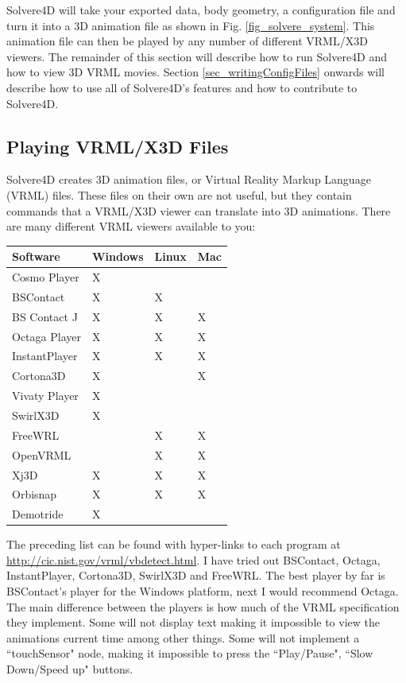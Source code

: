\documentclass[singlecolumn,12pt]{article}
\begin{document}
Solvere4D will take your exported data, body geometry, a
configuration file and turn it into a 3D animation file as shown in
Fig. \ref{fig_solvere_system}. This animation file can then be
played by any number of different VRML/X3D viewers. The remainder of
this section will describe how to run Solvere4D and how to view 3D
VRML movies. Section \ref{sec_writingConfigFiles} onwards will
describe how to use all of Solvere4D's features and how to
contribute to Solvere4D.

\subsection{Playing VRML/X3D Files}

Solvere4D creates 3D animation files, or Virtual Reality Markup
Language (VRML) files. These files on their own are not useful, but
they contain commands that a VRML/X3D viewer can translate into 3D
animations. There are many different VRML viewers available to you:

\vspace{1cm}
\begin{tabular}{l | l | l | l}
Software & Windows & Linux & Mac \\
\hline Cosmo Player & X & & \\
BSContact & X & X & \\
BS Contact J & X & X & X \\
Octaga Player & X & X & X \\
InstantPlayer & X & X & X \\
Cortona3D & X & & X \\
Vivaty Player & X & & \\
SwirlX3D & X & & \\
FreeWRL & & X & X \\
OpenVRML & & X & X \\
Xj3D & X & X & X  \\
Orbisnap & X & X & X \\
Demotride & X & & \\
\end{tabular}
\vspace{1cm}

The preceding list can be found with hyper-links to each program at
\url{http://cic.nist.gov/vrml/vbdetect.html}. I have tried out
BSContact, Octaga, InstantPlayer, Cortona3D, SwirlX3D and FreeWRL.
The best player by far is BSContact's player for the Windows
platform, next I would recommend Octaga. The main difference between
the players is how much of the VRML specification they implement.
Some will not display text making it impossible to view the
animations current time among other things. Some will not implement
a ``touchSensor" node, making it impossible to press the
``Play/Pause", ``Slow Down/Speed up" buttons.
\end{document}
